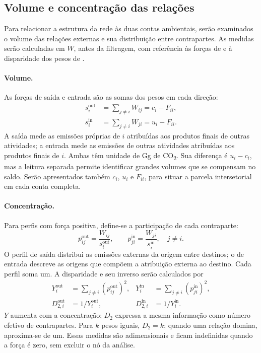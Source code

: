 \documentclass[12pt]{article}
\begin{document}
\subsection{Volume e concentração das relações}
\label{sec:volume-concentracao}

Para relacionar a estrutura da rede às duas contas ambientais, serão examinados o volume das relações externas e sua distribuição entre contrapartes. As medidas serão calculadas em $W$, antes da filtragem, com referência às forças de \textcite{huang2019} e à disparidade dos pesos de \textcite{serrano2009}.

\paragraph{Volume.}
As forças de saída e entrada são as somas dos pesos em cada direção:
\begin{equation}
\begin{aligned}
s_i^{\mathrm{out}}&=\sum_{j\ne i}W_{ij}=c_i-F_{ii},\\
s_i^{\mathrm{in}}&=\sum_{j\ne i}W_{ji}=u_i-F_{ii}.
\end{aligned}
\label{eq:forcas-externas}
\end{equation}
A saída mede as emissões próprias de $i$ atribuídas aos produtos finais de outras atividades; a entrada mede as emissões de outras atividades atribuídas aos produtos finais de $i$. Ambas têm unidade de Gg de CO\textsubscript{2}. Sua diferença é $u_i-c_i$, mas a leitura separada permite identificar grandes volumes que se compensam no saldo. Serão apresentados também $c_i$, $u_i$ e $F_{ii}$, para situar a parcela intersetorial em cada conta completa.

\paragraph{Concentração.}
Para perfis com força positiva, define-se a participação de cada contraparte:
\begin{equation}
p_{ij}^{\mathrm{out}}=\frac{W_{ij}}{s_i^{\mathrm{out}}},\qquad
p_{ji}^{\mathrm{in}}=\frac{W_{ji}}{s_i^{\mathrm{in}}},\quad j\ne i.
\label{eq:participacoes-externas}
\end{equation}
O perfil de saída distribui as emissões externas da origem entre destinos; o de entrada descreve as origens que compõem a atribuição externa ao destino. Cada perfil soma um. A disparidade e seu inverso serão calculados por
\begin{equation}
\begin{aligned}
Y_i^{\mathrm{out}}&=\sum_{j\ne i}(p_{ij}^{\mathrm{out}})^2,&
Y_i^{\mathrm{in}}&=\sum_{j\ne i}(p_{ji}^{\mathrm{in}})^2,\\
D_{2,i}^{\mathrm{out}}&=1/Y_i^{\mathrm{out}},&
D_{2,i}^{\mathrm{in}}&=1/Y_i^{\mathrm{in}}.
\end{aligned}
\label{eq:disparidade}
\end{equation}
$Y$ aumenta com a concentração; $D_2$ expressa a mesma informação como número efetivo de contrapartes. Para $k$ pesos iguais, $D_2=k$; quando uma relação domina, aproxima-se de um. Essas medidas são adimensionais e ficam indefinidas quando a força é zero, sem excluir o nó da análise.
\end{document}

